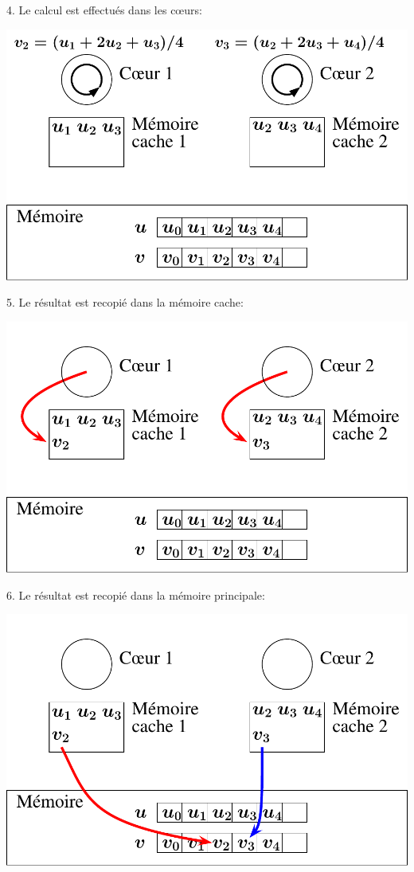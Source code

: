 \documentclass{beamer}
\begin{document}
\begin{frame}
	\parbox[t][1cm]{10cm}{4. Le calcul est effectués dans les c\oe urs:
	}
   \begin{center}
	\includegraphics[scale=0.6]{../Images/multithread3}
   \end{center}
\end{frame}

\begin{frame}
	\parbox[t][1cm]{10cm}{5. Le résultat est recopié dans la mémoire cache:}
	\begin{center}
		\includegraphics[scale=0.6]{../Images/multithread4}
	\end{center}
\end{frame}

\begin{frame}
	\parbox[t][1cm]{10cm}{6. Le résultat est recopié dans la mémoire principale:}
	\begin{center}
		\includegraphics[scale=0.6]{../Images/multithread5}
	\end{center}
\end{frame}
\end{document}
